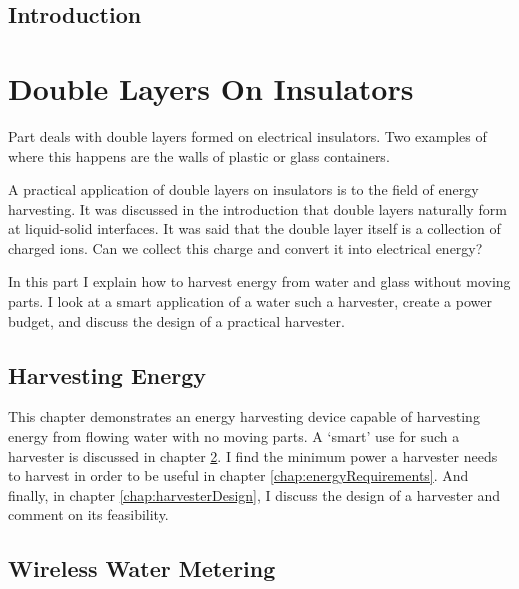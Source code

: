 
\chapter{Introduction}
    

\part{Double Layers On Insulators}

    \label{part:doubleLayersOnInsulators}
        
    Part \ref{part:doubleLayersOnInsulators} deals with double layers formed on electrical insulators.
    Two examples of where this happens are the walls of plastic or glass containers.
    
    A practical application of double layers on insulators is to the field of energy harvesting.
    It was discussed in the introduction that double layers naturally form at liquid-solid interfaces.
    It was said that the double layer itself is a collection of charged ions.
    Can we collect this charge and convert it into electrical energy?

    In this part I explain how to harvest energy from water and glass without moving parts.
    I look at a smart application of a water such a harvester, create a power budget, and discuss the design of a practical harvester.

    \chapter{Harvesting Energy}
        \label{chap:harvestingEnergy}

        This chapter demonstrates an energy harvesting device capable of harvesting energy from flowing water with no moving parts.
        A `smart' use for such a harvester is discussed in chapter \ref{chap:wirelessWaterMetering}.
        I find the minimum power a harvester needs to harvest in order to be useful in chapter \ref{chap:energyRequirements}.
        And finally, in chapter \ref{chap:harvesterDesign}, I discuss the design of a harvester and comment on its feasibility.

        

    \chapter{Wireless Water Metering}
        \label{chap:wirelessWaterMetering}


